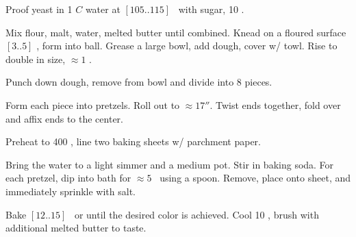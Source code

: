 \begin{preparation}
\item Proof yeast in 1 $C$ water at $[105..115]$ \Fahrenheit~with sugar, 10 \minute.

\item Mix flour, malt, water, melted butter until combined.
	Knead on a floured surface $[3..5]$ \minute, form into ball.
	Grease a large bowl, add dough, cover w/ towl.
	Rise to double in size, $\approx 1$ \hour.

\item Punch down dough, remove from bowl and divide into 8 pieces.

\item Form each piece into pretzels.
	Roll out to $\approx 17''$.
	Twist ends together, fold over and affix ends to the center.

\item Preheat to 400 \Fahrenheit, line two baking sheets w/ parchment paper.

\item Bring the water to a light simmer and a medium pot.
	Stir in baking soda.
	For each pretzel, dip into bath for $\approx 5$ \second~using a spoon.
	Remove, place onto sheet, and immediately sprinkle with salt.

\item Bake $[12..15]$ \minute~or until the desired color is achieved.
	Cool 10 \minute, brush with additional melted butter to taste.
\end{preparation}

\recipeend%
